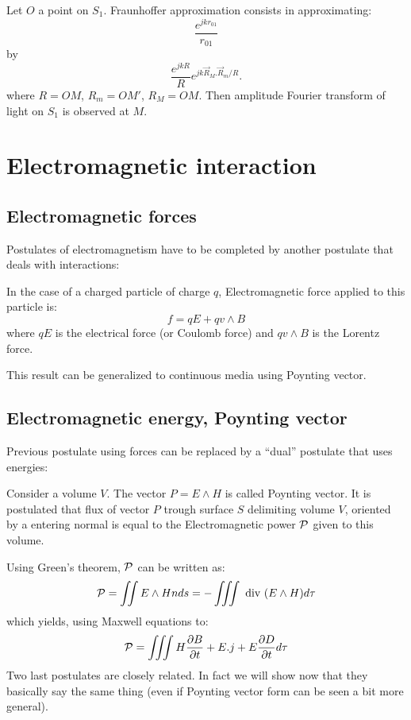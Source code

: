 \documentclass[12pt]{book}
\begin{document}
Let $O$ a point on $S_1$.
Fraunhoffer approximation   consists in
approximating:  
\begin{equation}
\frac{e^{jkr_{01}}}{r_{01}}
\end{equation}
by
\begin{equation}
\frac{e^{jkR}}{R}e^{jk\vec R_M.\vec R_m /R}.
\end{equation}
where  $R=OM$, $R_m=OM'$, $R_M=OM$.
Then amplitude Fourier transform of light on
$S_1$ is observed at $M$.







\section{Electromagnetic interaction}
\subsection{Electromagnetic forces}
Postulates of electromagnetism have to be completed by another postulate that
deals with interactions:
\begin{postulat}
In the case of a charged particle of charge $q$, Electromagnetic force
applied to this particle is:
\begin{equation}
f=qE+qv\wedge B
\end{equation}
where $qE$ is the electrical force (or Coulomb force)
 and $qv\wedge B$ is the Lorentz force.
\end{postulat}
This result can be generalized to continuous media using Poynting
vector. 
\subsection{Electromagnetic energy, Poynting vector}\label{secenergemag}
Previous postulate using forces can be replaced by a ``dual'' postulate that
uses energies:
\begin{postulat}
Consider a volume $V$. The vector $P=E\wedge H$ is called Poynting vector. It
is postulated that flux of vector $P$ trough surface $S$ delimiting volume
$V$, oriented by a entering normal is equal to the Electromagnetic power ${\cal
P}$ given to this volume. 
\end{postulat}
Using Green's theorem, ${\cal P}$ can be written as:
\begin{equation}
{\cal P}=\int\!\!\!\int E\wedge H n ds =-\int\!\!\!\int\!\!\!\int \mbox{ div } (E\wedge H)d\tau
\end{equation}
which yields, using Maxwell equations to:
\begin{equation}
{\cal P}=\int\!\!\!\int\!\!\!\int H\frac{\partial B}{\partial t}+E.j+E\frac{\partial
D}{\partial t}d\tau
\end{equation}
Two last postulates are closely related. In fact we will show now that they
basically say the same thing (even if Poynting vector form can be seen a bit
more general).
\end{document}
